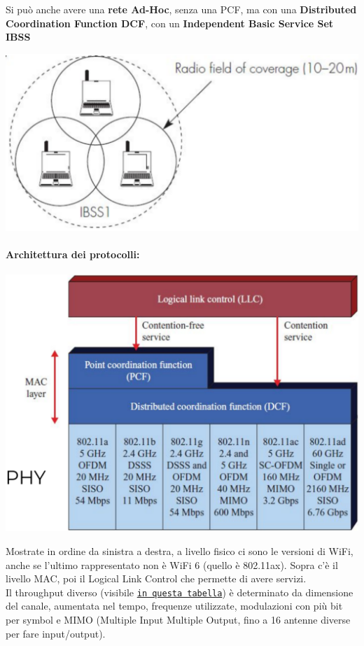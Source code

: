\newpage

Si può anche avere una \textbf{rete Ad-Hoc}, senza una PCF, ma con una \textbf{Distributed Coordination Function DCF}, con un \textbf{Independent Basic Service Set IBSS}
\begin{center}
	\includegraphics[width=0.45\linewidth]{img/wlan/wifistruct2}
\end{center}

\paragraph{Architettura dei protocolli:} 
\begin{center}
	\includegraphics[width=0.75\linewidth]{img/wlan/protarch1}
\end{center}
Mostrate in ordine da sinistra a destra, a livello fisico ci sono le versioni di WiFi, anche se l'ultimo rappresentato non è WiFi 6 (quello è 802.11ax). Sopra c'è il livello MAC, poi il Logical Link Control che permette di avere servizi. \\

Il throughput diverso (visibile \href{https://en.wikipedia.org/wiki/IEEE_802.11#Protocol}{\texttt{in questa tabella}}) è determinato da dimensione del canale, aumentata nel tempo, frequenze utilizzate, modulazioni con più bit per symbol e MIMO (Multiple Input Multiple Output, fino a 16 antenne diverse per fare input/output).\\

\newpage

